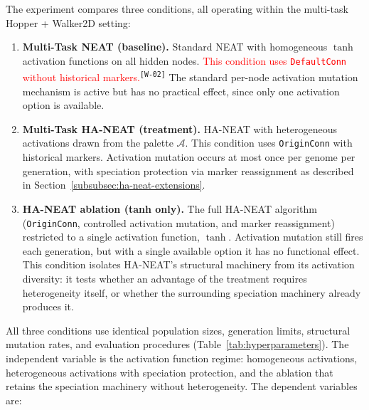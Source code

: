 \documentclass[12pt]{article}
\newcommand{\revID}[1]{\textsuperscript{\scriptsize\texttt{[#1]}}}
\newcommand{\revWrong}[2]{\textcolor{red}{#2}\revID{#1}}      %
\begin{document}
The experiment compares three conditions, all operating within the multi-task Hopper + Walker2D setting:

\begin{enumerate}
    \item \textbf{Multi-Task NEAT (baseline).} Standard NEAT with homogeneous $\tanh$ activation functions on all hidden nodes. \revWrong{W-02}{This condition uses \texttt{DefaultConn} without historical markers.} The standard per-node activation mutation mechanism is active but has no practical effect, since only one activation option is available.

    \item \textbf{Multi-Task HA-NEAT (treatment).} HA-NEAT with heterogeneous activations drawn from the palette $\mathcal{A}$. This condition uses \texttt{OriginConn} with historical markers. Activation mutation occurs at most once per genome per generation, with speciation protection via marker reassignment as described in Section~\ref{subsubsec:ha-neat-extensions}.

    \item \textbf{HA-NEAT ablation (tanh only).} The full HA-NEAT algorithm (\texttt{OriginConn}, controlled activation mutation, and marker reassignment) restricted to a single activation function, $\tanh$. Activation mutation still fires each generation, but with a single available option it has no functional effect. This condition isolates HA-NEAT's structural machinery from its activation diversity: it tests whether an advantage of the treatment requires heterogeneity itself, or whether the surrounding speciation machinery already produces it.
\end{enumerate}

All three conditions use identical population sizes, generation limits, structural mutation rates, and evaluation procedures (Table~\ref{tab:hyperparameters}).
The independent variable is the activation function regime: homogeneous activations, heterogeneous activations with speciation protection, and the ablation that retains the speciation machinery without heterogeneity.
The dependent variables are:
\end{document}
